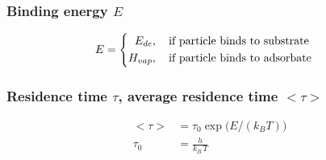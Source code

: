 \subsubsection*{Binding energy $E$}
\begin{equation}
	\label{eq:energy}
	E=
	\begin{cases}
		\begin{split}
		E_{de}&, \text{\quad if particle binds to substrate}\\
		H_{vap}&,  \text{\quad if particle binds to adsorbate}
		\end{split}
	\end{cases}
\end{equation}


\subsubsection*{Residence time $\tau$, average residence time $<\tau>$}
\begin{equation}
	\label{eq:sojourntime}
	\begin{split}
		<\tau>&=\tau_0 \exp\big(E/(k_B T)\big)\\
		 \tau_0 &= \frac{h}{k_B \, T}\\
	\end{split}
\end{equation}
\begin{comment}
\subsubsection*{Step size $t_{step}$}
\begin{equation}
	\label{eq:tstep}
	\begin{split}
	t_{min}&=\text{ProblemDef::t\_min}\\
	t_{i}&=t_{min} \cdot \exp\big(\text{i}\cdot \ln(\text{ProblemDef::maxTimeS}/T_{min})/\text{ProblemDef::iterationNumber})\big)\\
	t_{step}&=\text{min}\big(t_{currentStep+1}-t_{currentStep}, \text{ProblemDef::t\_max}\big)\\
	\end{split}
\end{equation}
\end{comment}
